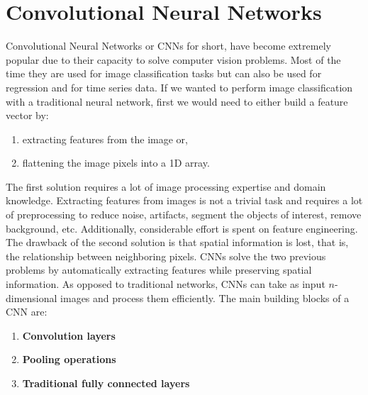 \documentclass[
  11pt,
]{krantz}
\providecommand{\tightlist}{%
  \setlength{\itemsep}{0pt}\setlength{\parskip}{0pt}}
\begin{document}
\hypertarget{cnns}{%
\section{Convolutional Neural Networks}\label{cnns}}

Convolutional Neural Networks or CNNs for short, have become extremely popular due to their capacity to solve computer vision problems. Most of the time they are used for image classification tasks but can also be used for regression and for time series data. If we wanted to perform image classification with a traditional neural network, first we would need to either build a feature vector by:

\begin{enumerate}
\def\labelenumi{\arabic{enumi}.}
\tightlist
\item
  extracting features from the image or,
\item
  flattening the image pixels into a 1D array.
\end{enumerate}

The first solution requires a lot of image processing expertise and domain knowledge. Extracting features from images is not a trivial task and requires a lot of preprocessing to reduce noise, artifacts, segment the objects of interest, remove background, etc. Additionally, considerable effort is spent on feature engineering. The drawback of the second solution is that spatial information is lost, that is, the relationship between neighboring pixels. CNNs solve the two previous problems by automatically extracting features while preserving spatial information. As opposed to traditional networks, CNNs can take as input \(n\)-dimensional images and process them efficiently. The main building blocks of a CNN are:

\begin{enumerate}
\def\labelenumi{\arabic{enumi}.}
\tightlist
\item
  \textbf{Convolution layers}
\item
  \textbf{Pooling operations}
\item
  \textbf{Traditional fully connected layers}
\end{enumerate}
\end{document}
